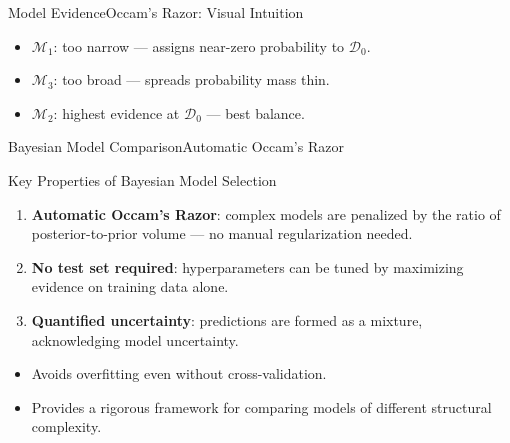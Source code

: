 \begin{frame}{Model Evidence}{Occam's Razor: Visual Intuition}
  \begin{center}
  \end{center}
  \small
  \begin{itemize}
    \item $\mathcal{M}_1$: too narrow — assigns near-zero probability to $\mathcal{D}_0$.
    \item $\mathcal{M}_3$: too broad — spreads probability mass thin.
    \item $\mathcal{M}_2$: highest evidence at $\mathcal{D}_0$ — best balance.
  \end{itemize}
\end{frame}

\begin{frame}{Bayesian Model Comparison}{Automatic Occam's Razor}
  \begin{exampleblock}{Key Properties of Bayesian Model Selection}
    \begin{enumerate}
      \item \textbf{Automatic Occam's Razor}: complex models are penalized by the ratio of posterior-to-prior volume — no manual regularization needed.
      \item \textbf{No test set required}: hyperparameters can be tuned by maximizing evidence on training data alone.
      \item \textbf{Quantified uncertainty}: predictions are formed as a mixture, acknowledging model uncertainty.
    \end{enumerate}
  \end{exampleblock}

  \begin{itemize}
    \item Avoids overfitting even without cross-validation.
    \item Provides a rigorous framework for comparing models of different structural complexity.
  \end{itemize}
\end{frame}

